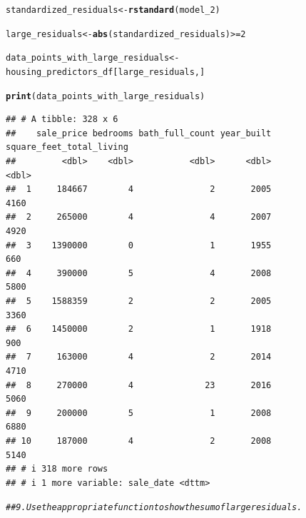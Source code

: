 \documentclass{article}\usepackage[]{graphicx}\usepackage[]{xcolor}
\makeatletter
\newcommand{\hlnum}[1]{\textcolor[rgb]{0.686,0.059,0.569}{#1}}%
\newcommand{\hlcom}[1]{\textcolor[rgb]{0.678,0.584,0.686}{\textit{#1}}}%
\newcommand{\hlopt}[1]{\textcolor[rgb]{0,0,0}{#1}}%
\newcommand{\hlstd}[1]{\textcolor[rgb]{0.345,0.345,0.345}{#1}}%
\newcommand{\hlkwb}[1]{\textcolor[rgb]{0.69,0.353,0.396}{#1}}%
\newcommand{\hlkwd}[1]{\textcolor[rgb]{0.737,0.353,0.396}{\textbf{#1}}}%
\newenvironment{kframe}{%
 \def\at@end@of@kframe{}%
 \ifinner\ifhmode%
  \def\at@end@of@kframe{\end{minipage}}%
  \begin{minipage}{\columnwidth}%
 \fi\fi%
 \def\FrameCommand##1{\hskip\@totalleftmargin \hskip-\fboxsep
 \colorbox{shadecolor}{##1}\hskip-\fboxsep
     \hskip-\linewidth \hskip-\@totalleftmargin \hskip\columnwidth}%
 \MakeFramed {\advance\hsize-\width
   \@totalleftmargin\z@ \linewidth\hsize
   \@setminipage}}%
 {\par\unskip\endMakeFramed%
 \at@end@of@kframe}
\newenvironment{knitrout}{}{} %
\makeatother
\begin{document}
\begin{knitrout}
\begin{kframe}
\begin{alltt}
\hlstd{standardized_residuals} \hlkwb{<-} \hlkwd{rstandard}\hlstd{(model_2)}

\hlstd{large_residuals} \hlkwb{<-} \hlkwd{abs}\hlstd{(standardized_residuals)} \hlopt{>=} \hlnum{2}

\hlstd{data_points_with_large_residuals} \hlkwb{<-} \hlstd{housing_predictors_df[large_residuals, ]}

\hlkwd{print}\hlstd{(data_points_with_large_residuals)}
\end{alltt}
\begin{verbatim}
## # A tibble: 328 x 6
##    sale_price bedrooms bath_full_count year_built square_feet_total_living
##         <dbl>    <dbl>           <dbl>      <dbl>                    <dbl>
##  1     184667        4               2       2005                     4160
##  2     265000        4               4       2007                     4920
##  3    1390000        0               1       1955                      660
##  4     390000        5               4       2008                     5800
##  5    1588359        2               2       2005                     3360
##  6    1450000        2               1       1918                      900
##  7     163000        4               2       2014                     4710
##  8     270000        4              23       2016                     5060
##  9     200000        5               1       2008                     6880
## 10     187000        4               2       2008                     5140
## # i 318 more rows
## # i 1 more variable: sale_date <dttm>
\end{verbatim}
\begin{alltt}
\hlcom{## 9. Use the appropriate function to show the sum of large residuals.}


\end{alltt}
\end{kframe}
\end{knitrout}
\end{document}

